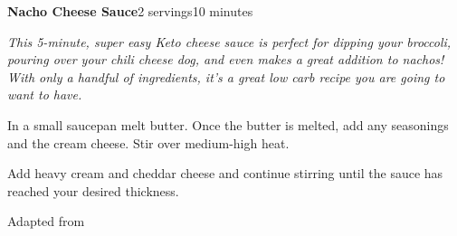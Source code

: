 \documentclass[../recipe-collections/cooking.tex]{subfiles}
\begin{document}
\begin{recipe}{\textbf{Nacho Cheese Sauce}}{2 servings}{10 minutes}

  \freeform{}\textit{This 5-minute, super easy Keto cheese sauce is 
  perfect for dipping your broccoli, pouring over your chili cheese 
  dog, and even makes a great addition to nachos! With only a handful 
  of ingredients, it's a great low carb recipe you are going to want 
  to have.}


  In a small saucepan melt butter. Once the butter is melted, add any 
  seasonings and the cream cheese. Stir over medium-high heat. 


  Add heavy cream and cheddar cheese and continue stirring until the 
  sauce has reached your desired thickness. 

  \freeform{}\hrulefill{}

\end{recipe}

Adapted from  
\autocite{ICantBelieveItsLowCarb_NachoCheeseSauce_2020}
\end{document}
